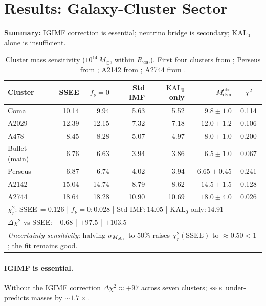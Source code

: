 \documentclass[12pt,a4paper]{article}
\newcommand{\SSEE}{\ifmmode\mathrm{SSEE}\else\textsc{ssee}\fi}
\newcommand{\KALz}{\mathrm{KAL}_0}
\newcommand{\Mobs}{M^{\mathrm{obs}}_{\mathrm{dyn}}}
\begin{document}
\section{Results: Galaxy-Cluster Sector}
\label{sec:results_clusters}

\noindent\textbf{Summary:} IGIMF correction is essential; neutrino bridge is secondary; $\KALz$ alone is insufficient.

\begin{table}[H]
\centering
\caption{Cluster mass sensitivity ($10^{14}\,M_\odot$, within $R_{200}$).
First four clusters from \citet{Zhang2026}; Perseus from \citet{Simionescu2011};
A2142 from \citet{Tchernin2016}; A2744 from \citet{Merten2011}.}
\label{tab:cluster_sensitivity}
\small
\begin{tabular}{lrrrrrc}
\toprule
Cluster & SSEE & $f_\nu{=}0$ & Std IMF & $\KALz$ only & $\Mobs$ & $\chi^2$ \\
\midrule
Coma          & 10.14 &  9.94 & 5.63 & 5.52 & $9.8\pm1.0$   & 0.114 \\
A2029         & 12.39 & 12.15 & 7.32 & 7.18 & $12.0\pm1.2$  & 0.106 \\
A478          &  8.45 &  8.28 & 5.07 & 4.97 & $8.0\pm1.0$   & 0.200 \\
Bullet (main) &  6.76 &  6.63 & 3.94 & 3.86 & $6.5\pm1.0$   & 0.067 \\
Perseus       &  6.87 &  6.74 & 4.02 & 3.94 & $6.65\pm0.45$ & 0.241 \\
A2142         & 15.04 & 14.74 & 8.79 & 8.62 & $14.5\pm1.5$  & 0.128 \\
A2744         & 18.64 & 18.28 &10.90 &10.69 & $18.0\pm4.0$  & 0.026 \\
\midrule
\multicolumn{7}{l}{$\chi^2_r$: SSEE\,$=0.126$ \;|\; $f_\nu{=}0$:\,$0.028$ \;|\;
  Std IMF:\,$14.05$ \;|\; $\KALz$ only:\,$14.91$} \\
\multicolumn{7}{l}{$\Delta\chi^2$ vs SSEE: $-0.68$ \;|\; $+97.5$ \;|\; $+103.5$} \\
\multicolumn{7}{l}{\textit{Uncertainty sensitivity}: halving $\sigma_{M_{\rm obs}}$ to 50\%
  raises $\chi^2_r(\mathrm{SSEE})$ to $\approx0.50 < 1$; the fit remains good.} \\
\bottomrule
\end{tabular}
\end{table}

\paragraph{IGIMF is essential.}
Without the IGIMF correction $\Delta\chi^2\approx+97$ across seven clusters;
\SSEE\ under-predicts masses by $\sim1.7\times$.
\end{document}
